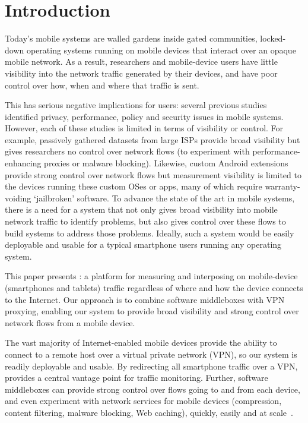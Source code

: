 \section{Introduction}
\label{sec:introduction}

Today's mobile systems are walled gardens inside gated communities, \ie{} locked-down operating systems 
running on mobile devices that interact over an opaque mobile network. As a result, 
researchers and mobile-device users have little visibility into the network traffic generated by 
their devices, and have poor control over how, when and where that traffic is sent. 

This has serious negative implications for users: several previous studies~\cite{vallina-rod:ads,gerber:passivespeed,chen:wifi,enck:taintdroid,wang:middleboxes,sommers:cellwifi} 
identified privacy, performance, policy and security issues in mobile systems. However, each of these studies 
is limited in terms of visibility or control. For example, passively gathered datasets from large 
ISPs provide broad visibility but gives researchers no control over network flows (\eg to experiment with 
performance-enhancing proxies or malware blocking). Likewise, custom Android extensions provide 
strong control over network flows but measurement visibility is limited to the devices running these custom OSes or apps, many of which require warranty-voiding `jailbroken' software. 
To advance the state of the art in mobile systems, there is a need for a system that not only gives 
broad visibility into mobile network traffic to identify problems, but also gives control over these flows 
to build systems to address those problems.
Ideally, such a system would be easily deployable and usable for a typical smartphone users running any operating system.

This paper presents \meddle:  a platform for measuring and interposing on mobile-device (\eg smartphones and tablets) 
traffic regardless of where and how the device connects to the Internet. Our approach is to combine software middleboxes 
with VPN proxying, enabling our system to provide broad visibility and strong control over network flows from a mobile device. 

The vast majority of Internet-enabled mobile devices provide the ability to connect to a remote host over a virtual private network (VPN), so our system is readily deployable and usable. 
By redirecting all smartphone traffic over a VPN, \meddle provides a central vantage point for traffic monitoring.
Further, software middleboxes can provide strong control over flows going to and from each device, and even experiment with network services for mobile devices (\eg compression, content filtering, malware blocking, Web caching), quickly, easily and at scale~\cite{sherry:middleboxes}. %

